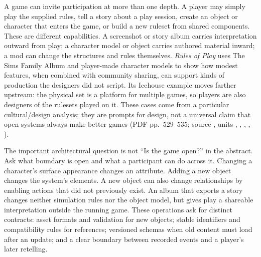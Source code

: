 \hypertarget{06-engine-ii-ch046-design-a-game-system-that-can-be-continued-by-players}{}

A game can invite participation at more than one depth. A player may simply play the supplied rules, tell a story about a play session, create an object or character that enters the game, or build a new ruleset from shared components. These are different capabilities. A screenshot or story album carries interpretation outward from play; a character model or object carries authored material inward; a mod can change the structures and rules themselves. \emph{Rules of Play} uses The Sims Family Album and player-made character models to show how modest features, when combined with community sharing, can support kinds of production the designers did not script. Its Icehouse example moves farther upstream: the physical set is a platform for multiple games, so players are also designers of the rulesets played on it. These cases come from a particular cultural/design analysis; they are prompts for design, not a universal claim that open systems always make better games (PDF pp.~529--535; source , units , , , , ).

The important architectural question is not ``Is the game open?'' in the abstract. Ask what boundary is open and what a participant can do across it. Changing a character's surface appearance changes an attribute. Adding a new object changes the system's elements. A new object can also change relationships by enabling actions that did not previously exist. An album that exports a story changes neither simulation rules nor the object model, but gives play a shareable interpretation outside the running game. These operations ask for distinct contracts: asset formats and validation for new objects; stable identifiers and compatibility rules for references; versioned schemas when old content must load after an update; and a clear boundary between recorded events and a player's later retelling.

